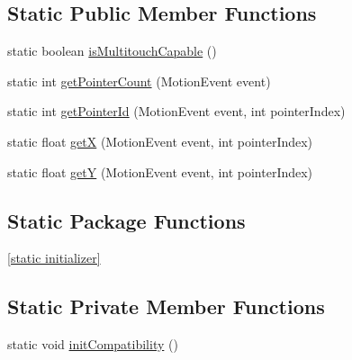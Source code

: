 \subsection*{\-Static \-Public \-Member \-Functions}
\begin{DoxyCompactItemize}
\item 
static boolean \hyperlink{classcom_1_1_cyberpad_1_1_reroot_1_1_wrapped_motion_event_af740c5900bcd52d90c0eb98fe297289a}{is\-Multitouch\-Capable} ()
\item 
static int \hyperlink{classcom_1_1_cyberpad_1_1_reroot_1_1_wrapped_motion_event_ab8dc934ac3465ba6a9510b35574a36ed}{get\-Pointer\-Count} (\-Motion\-Event event)
\item 
static int \hyperlink{classcom_1_1_cyberpad_1_1_reroot_1_1_wrapped_motion_event_a3488717395c2a7acb423af42fae5a67e}{get\-Pointer\-Id} (\-Motion\-Event event, int pointer\-Index)
\item 
static float \hyperlink{classcom_1_1_cyberpad_1_1_reroot_1_1_wrapped_motion_event_ac5a8816d7ddea649f5d099291a4a0c9d}{get\-X} (\-Motion\-Event event, int pointer\-Index)
\item 
static float \hyperlink{classcom_1_1_cyberpad_1_1_reroot_1_1_wrapped_motion_event_a7e003950e621ca1fb0f02e31eafe2090}{get\-Y} (\-Motion\-Event event, int pointer\-Index)
\end{DoxyCompactItemize}
\subsection*{\-Static \-Package \-Functions}
\begin{DoxyCompactItemize}
\item 
\hyperlink{classcom_1_1_cyberpad_1_1_reroot_1_1_wrapped_motion_event_a616f50444b9d4ccae214d42278f9d3c0}{\mbox{[}static initializer\mbox{]}}
\end{DoxyCompactItemize}
\subsection*{\-Static \-Private \-Member \-Functions}
\begin{DoxyCompactItemize}
\item 
static void \hyperlink{classcom_1_1_cyberpad_1_1_reroot_1_1_wrapped_motion_event_ad649a7468f476c7cb6f769516a21983a}{init\-Compatibility} ()
\end{DoxyCompactItemize}

